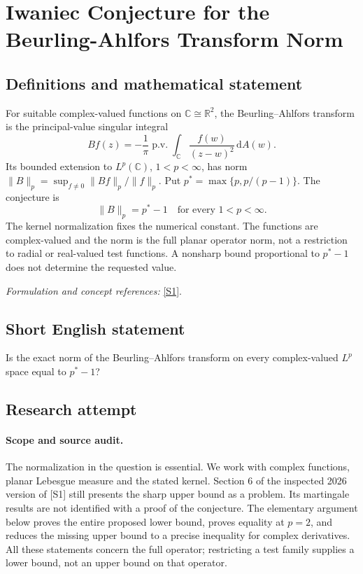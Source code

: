 \documentclass[11pt]{article}
\begin{document}
\section*{\texorpdfstring{Iwaniec Conjecture for the Beurling-Ahlfors Transform Norm}{Iwaniec Conjecture for the Beurling-Ahlfors Transform Norm}}\label{30006881}
\subsection{Definitions and mathematical statement}
For suitable complex-valued functions on ${\mathbb{C}}\cong{\mathbb{R}}^2$, the Beurling--Ahlfors transform is the principal-value singular integral
\[
 Bf(z)=-\frac1\pi\operatorname{p.v.}\int_{{\mathbb{C}}}
 \frac{f(w)}{(z-w)^2}{\,\mathrm{d}} A(w).
\]
Its bounded extension to $L^p({\mathbb{C}})$, $1<p<\infty$, has norm $\|B\|_p=\sup_{f\ne0}\|Bf\|_p/\|f\|_p$. Put $p^*=\max\{p,p/(p-1)\}$. The conjecture is
\[
 \|B\|_p=p^*-1\quad\text{for every }1<p<\infty.
\]
The kernel normalization fixes the numerical constant. The functions are complex-valued and the norm is the full planar operator norm, not a restriction to radial or real-valued test functions. A nonsharp bound proportional to $p^*-1$ does not determine the requested value.
\par\smallskip\textit{Formulation and concept references:} \href{https://arxiv.org/html/2604.09365v2#S6}{[S1]}.

\subsection{Short English statement}
Is the exact norm of the Beurling--Ahlfors transform on every complex-valued $L^p$ space equal to $p^*-1$?
\subsection{Research attempt}
\paragraph{Scope and source audit.}
The normalization in the question is essential. We work with complex
functions, planar Lebesgue measure and the stated kernel. Section 6 of
the inspected 2026 version of [S1] still presents the sharp upper
bound as a problem. Its martingale results are not identified with a
proof of the conjecture. The elementary argument below proves the
entire proposed lower bound, proves equality at $p=2$, and reduces
the missing upper bound to a precise inequality for complex derivatives.
All these statements concern the full operator; restricting a test
family supplies a lower bound, not an upper bound on that operator.
\end{document}
